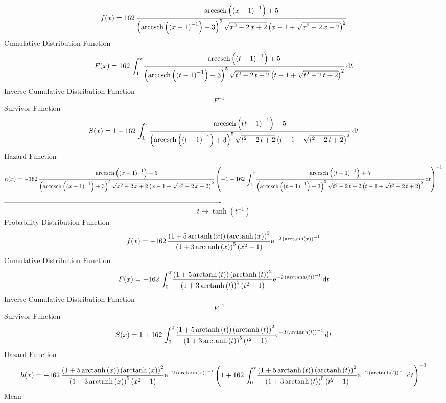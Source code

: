 \documentclass[12pt]{article}
\begin{document}
$$  f(x)=162\,{\frac {{\rm arccsch} \left( \left( x-1 \right) ^{-1}\right)+5}{
 \left( {\rm arccsch} \left( \left( x-1 \right) ^{-1}\right)+3
 \right) ^{5}\sqrt {{x}^{2}-2\,x+2} \left( x-1+\sqrt {{x}^{2}-2\,x+2}
 \right) ^{2}}}
$$Cumulative Distribution Function  
 $$F(x)=162\,\int_{1}^{x}\!{\frac {{\rm arccsch} \left( \left( t-1 \right) ^{-
1}\right)+5}{ \left( {\rm arccsch} \left( \left( t-1 \right) ^{-1}
\right)+3 \right) ^{5}\sqrt {{t}^{2}-2\,t+2} \left( t-1+\sqrt {{t}^{2}
-2\,t+2} \right) ^{2}}}\,{\rm d}t
$$ Inverse Cumulative Distribution Function 
  $$F^{-1} = $$Survivor Function 
 $$ S(x)=1-162\,\int_{1}^{x}\!{\frac {{\rm arccsch} \left( \left( t-1 \right) ^
{-1}\right)+5}{ \left( {\rm arccsch} \left( \left( t-1 \right) ^{-1}
\right)+3 \right) ^{5}\sqrt {{t}^{2}-2\,t+2} \left( t-1+\sqrt {{t}^{2}
-2\,t+2} \right) ^{2}}}\,{\rm d}t
$$ Hazard Function 
 $$ h(x)=-162\,{\frac {{\rm arccsch} \left( \left( x-1 \right) ^{-1}\right)+5}{
 \left( {\rm arccsch} \left( \left( x-1 \right) ^{-1}\right)+3
 \right) ^{5}\sqrt {{x}^{2}-2\,x+2} \left( x-1+\sqrt {{x}^{2}-2\,x+2}
 \right) ^{2}} \left( -1+162\,\int_{1}^{x}\!{\frac {{\rm arccsch} 
\left( \left( t-1 \right) ^{-1}\right)+5}{ \left( {\rm arccsch} \left(
 \left( t-1 \right) ^{-1}\right)+3 \right) ^{5}\sqrt {{t}^{2}-2\,t+2}
 \left( t-1+\sqrt {{t}^{2}-2\,t+2} \right) ^{2}}}\,{\rm d}t \right) ^{
-1}}
$$-------------------------------------------------------------------------------------------  \\$$t\mapsto \tanh \left( {t}^{-1} \right) 
$$Probability Distribution Function 
$$  f(x)=-162\,{\frac { \left( 1+5\,{\rm arctanh} \left(x\right) \right) 
 \left( {\rm arctanh} \left(x\right) \right) ^{2}}{ \left( 1+3\,
{\rm arctanh} \left(x\right) \right) ^{5} \left( {x}^{2}-1 \right) }{
{\rm e}^{-2\, \left( {\rm arctanh} \left(x\right) \right) ^{-1}}}}
$$Cumulative Distribution Function  
 $$F(x)=-162\,\int_{0}^{x}\!{\frac { \left( 1+5\,{\rm arctanh} \left(t\right)
 \right)  \left( {\rm arctanh} \left(t\right) \right) ^{2}}{ \left( 1+
3\,{\rm arctanh} \left(t\right) \right) ^{5} \left( {t}^{2}-1 \right) 
}{{\rm e}^{-2\, \left( {\rm arctanh} \left(t\right) \right) ^{-1}}}}
\,{\rm d}t
$$ Inverse Cumulative Distribution Function 
  $$F^{-1} = $$Survivor Function 
 $$ S(x)=1+162\,\int_{0}^{x}\!{\frac { \left( 1+5\,{\rm arctanh} \left(t\right)
 \right)  \left( {\rm arctanh} \left(t\right) \right) ^{2}}{ \left( 1+
3\,{\rm arctanh} \left(t\right) \right) ^{5} \left( {t}^{2}-1 \right) 
}{{\rm e}^{-2\, \left( {\rm arctanh} \left(t\right) \right) ^{-1}}}}
\,{\rm d}t
$$ Hazard Function 
 $$ h(x)=-162\,{\frac { \left( 1+5\,{\rm arctanh} \left(x\right) \right) 
 \left( {\rm arctanh} \left(x\right) \right) ^{2}}{ \left( 1+3\,
{\rm arctanh} \left(x\right) \right) ^{5} \left( {x}^{2}-1 \right) }{
{\rm e}^{-2\, \left( {\rm arctanh} \left(x\right) \right) ^{-1}}}
 \left( 1+162\,\int_{0}^{x}\!{\frac { \left( 1+5\,{\rm arctanh} \left(
t\right) \right)  \left( {\rm arctanh} \left(t\right) \right) ^{2}}{
 \left( 1+3\,{\rm arctanh} \left(t\right) \right) ^{5} \left( {t}^{2}-
1 \right) }{{\rm e}^{-2\, \left( {\rm arctanh} \left(t\right) \right) 
^{-1}}}}\,{\rm d}t \right) ^{-1}}
$$Mean 
\end{document}
